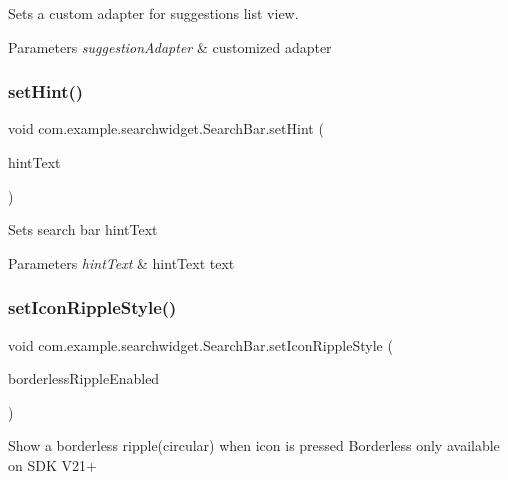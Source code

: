 Sets a custom adapter for suggestions list view.


\begin{DoxyParams}{Parameters}
{\em suggestion\+Adapter} & customized adapter \\
\hline
\end{DoxyParams}
\mbox{\label{classcom_1_1example_1_1searchwidget_1_1_search_bar_a0f7d73658027bd472ea96b299249f48b}} 
\subsubsection{\texorpdfstring{setHint()}{setHint()}}
{\footnotesize\ttfamily void com.\+example.\+searchwidget.\+Search\+Bar.\+set\+Hint (\begin{DoxyParamCaption}\item[{Char\+Sequence}]{hint\+Text }\end{DoxyParamCaption})}

Sets search bar hint\+Text


\begin{DoxyParams}{Parameters}
{\em hint\+Text} & hint\+Text text \\
\hline
\end{DoxyParams}
\mbox{\label{classcom_1_1example_1_1searchwidget_1_1_search_bar_a2b5871caacebd12411dbc3bdf3d7c5a1}} 
\subsubsection{\texorpdfstring{setIconRippleStyle()}{setIconRippleStyle()}}
{\footnotesize\ttfamily void com.\+example.\+searchwidget.\+Search\+Bar.\+set\+Icon\+Ripple\+Style (\begin{DoxyParamCaption}\item[{boolean}]{borderless\+Ripple\+Enabled }\end{DoxyParamCaption})}

Show a borderless ripple(circular) when icon is pressed Borderless only available on S\+DK V21+


